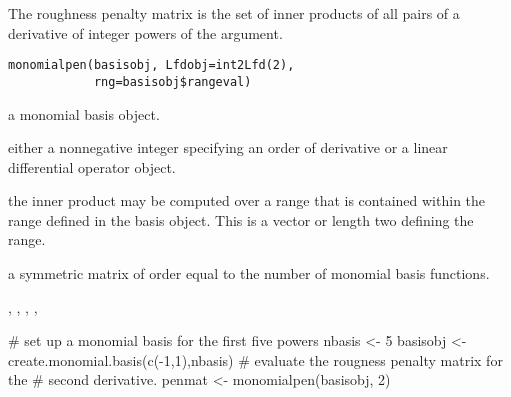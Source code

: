 \documentclass{article}
\begin{document}
\begin{Description}\relax
The roughness penalty matrix is the set of
inner products of all pairs of a derivative of integer powers of the
argument.
\end{Description}
\begin{Usage}
\begin{verbatim}
monomialpen(basisobj, Lfdobj=int2Lfd(2),
            rng=basisobj$rangeval)
\end{verbatim}
\end{Usage}
\begin{Arguments}
\begin{ldescription}
\item[\code{basisobj}] a monomial basis object.

\item[\code{Lfdobj}] either a nonnegative integer specifying an order of derivative
or a linear differential operator object.

\item[\code{rng}] the inner product may be computed over a range that is contained
within the range defined in the basis object.  This is a vector
or length two defining the range.

\end{ldescription}
\end{Arguments}
\begin{Value}
a symmetric matrix of order equal to the number of
monomial basis functions.
\end{Value}
\begin{SeeAlso}\relax
{}, 
, 
, 
, 
\end{SeeAlso}
\begin{Examples}
\begin{ExampleCode}

# set up a monomial basis for the first five powers
nbasis   <- 5
basisobj <- create.monomial.basis(c(-1,1),nbasis)
#  evaluate the rougness penalty matrix for the
#  second derivative.
penmat <- monomialpen(basisobj, 2)

\end{ExampleCode}
\end{Examples}
\end{document}
